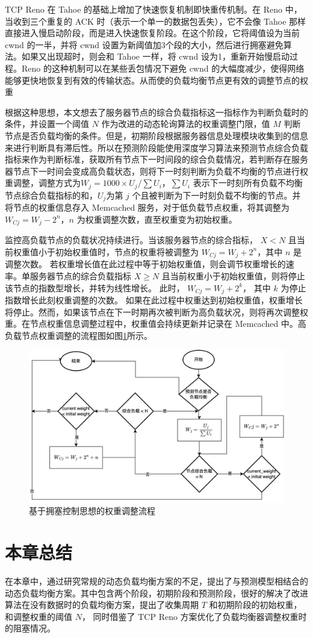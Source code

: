 TCP Reno 在 Tahoe 的基础上增加了快速恢复机制即快重传机制。在 Reno 中，当收到三个重复的 ACK 时（表示一个单一的数据包丢失），它不会像 Tahoe 那样直接进入慢启动阶段，而是进入快速恢复阶段。在这个阶段，它将阈值设为当前 cwnd 的一半，并将 cwnd 设置为新阈值加3个段的大小，然后进行拥塞避免算法。如果又出现超时，则会和 Tahoe 一样，将 cwnd 设为1，重新开始慢启动过程。Reno 的这种机制可以在某些丢包情况下避免 cwnd 的大幅度减少，使得网络能够更快地恢复到有效的传输状态。从而使的负载均衡节点更有效的调整节点的权重

根据这种思想，本文想去了服务器节点的综合负载指标这一指标作为判断负载时的条件，并设置一个阈值 $N$ 作为改进的动态轮询算法的权重调整门限，值 $M$ 判断节点是否负载均衡的条件。但是，初期阶段根据服务器信息处理模块收集到的信息来进行判断具有滞后性。所以在预测阶段能使用深度学习算法来预测节点综合负载指标来作为判断标准，获取所有节点下一时间段的综合负载情况，若判断存在服务器节点下一时间会变成高负载状态，则将下一时刻判断为负载不均衡的节点进行权重调整，调整方式为$W_j = 1000 \times U_j / \sum U_i$，$\sum U_i$ 表示下一时刻所有负载不均衡节点综合负载指标的和，$U_j$为第 $j$ 个且被判断为下一时刻负载不均衡的节点。并将节点的权重信息存入 Memcached 服务，对于低负载节点权重，将其调整为 $W_{Cj} = W_j - 2^n$，$n$ 为权重调整次数，直至权重变为初始权重。

监控高负载节点的负载状况持续进行。当该服务器节点的综合指标， $X < N$ 且当前权重值小于初始权重值时，节点的权重将被调整为 $W_{Cj} = W_j + 2^n$，其中 $n$ 是调整次数。
若权重增长值在此过程中等于初始权重值，则会调节权重增长的速率。单服务器节点的综合负载指标 $X \ge N$ 且当前权重小于初始权重值，则将停止该节点的指数型增长，并转为线性增长。 此时， $W_{Cj} = W_j + 2^k$， 其中 $k$ 为停止指数增长此刻权重调整的次数。
如果在此过程中权重达到初始权重值，权重增长将停止。然而，如果该节点在下一时期再次被判断为高负载状况，则将再次调整权重。在节点权重信息调整过程中，权重值会持续更新并记录在 Memcached 中。高负载节点权重调整的流程图如图\ref{contral_weight}所示。

\begin{figure}[htbp]
  \centering
  \includegraphics[width=.9\textwidth]{figures/change_weight.png}
  \caption{基于拥塞控制思想的权重调整流程}
  \label{contral_weight}
\end{figure}

\section{本章总结}

在本章中，通过研究常规的动态负载均衡方案的不足，提出了与预测模型相结合的动态负载均衡方案。其中包含两个阶段，初期阶段和预测阶段，很好的解决了改进算法在没有数据时的负载均衡方案，提出了收集周期 $T$ 和初期阶段的初始权重，和调整权重的阈值 $N$，
同时借鉴了 TCP Reno 方案优化了负载均衡器调整权重时的阻塞情况。
